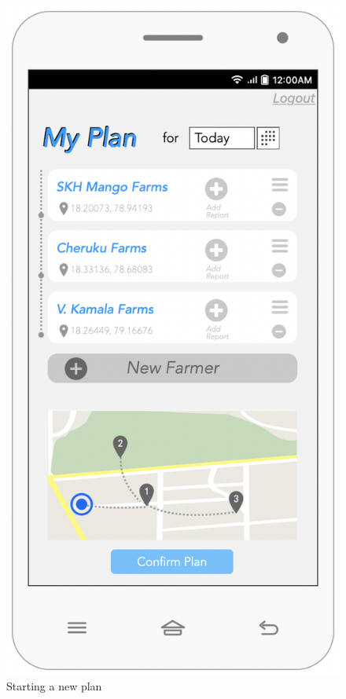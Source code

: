 \begin{multicols}{2}
\begin{figure}[H]
\centering
\includegraphics[scale=0.5]{../images_diagrams/mock_ups/dd/Plan01_Start.png}
\caption{\label{fig:mockplan_start}Starting a new plan}
\end{figure}


\end{multicols}
